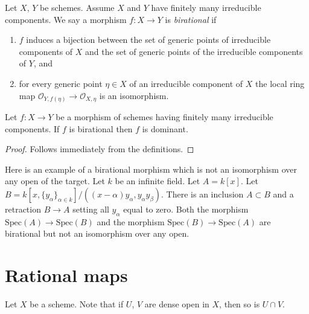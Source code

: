 \begin{definition}
\label{definition-birational}
Let $X$, $Y$ be schemes. Assume $X$ and $Y$ have finitely many
irreducible components. We say a morphism $f : X \to Y$ is
{\it birational} if
\begin{enumerate}
\item $f$ induces a bijection between the set of generic points
of irreducible components of $X$ and the set of generic points
of the irreducible components of $Y$, and
\item for every generic point $\eta \in X$ of an irreducible component
of $X$ the local ring map
$\mathcal{O}_{Y, f(\eta)} \to \mathcal{O}_{X, \eta}$
is an isomorphism.
\end{enumerate}
\end{definition}

\begin{lemma}
\label{lemma-birational-dominant}
Let $f : X \to Y$ be a morphism of schemes having finitely
many irreducible components. If $f$ is birational then
$f$ is dominant.
\end{lemma}

\begin{proof}
Follows immediately from the definitions.
\end{proof}

\begin{example}
\label{example-birational-not-iso-over-open}
Here is an example of a birational morphism which is not an isomorphism
over any open of the target.
Let $k$ be an infinite field.
Let $A = k[x]$. Let
$B = k[x, \{y_{\alpha}\}_{\alpha \in k}]/
((x-\alpha)y_\alpha, y_\alpha y_\beta)$.
There is an inclusion $A \subset B$ and a retraction $B \to A$
setting all $y_\alpha$ equal to zero.
Both the morphism $\text{Spec}(A) \to \text{Spec}(B)$
and the morphism $\text{Spec}(B) \to \text{Spec}(A)$ are birational
but not an isomorphism over any open.
\end{example}





\section{Rational maps}
\label{section-rational-maps}

\noindent
Let $X$ be a scheme. Note that if $U$, $V$ are dense open
in $X$, then so is $U \cap V$.

